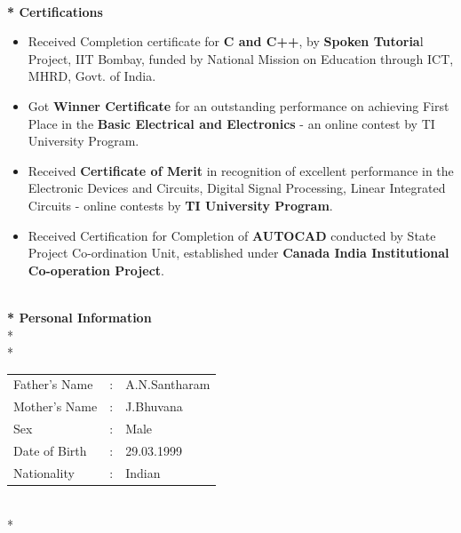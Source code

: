 \documentclass{article}
\begin{document}
\begin{flushleft}
\begin{enumerate}
\begin{itemize}
\end{itemize}
\end{enumerate}

\textbf{\\*  Certifications}
\begin{itemize}
\item Received Completion certificate for \textbf{C and C++}, by \textbf{Spoken Tutoria}l Project, IIT Bombay, funded by National Mission on Education through ICT, MHRD, Govt. of India.
\item Got \textbf{Winner Certificate} for an outstanding performance on achieving First Place in the \textbf{Basic Electrical and Electronics} - an online contest by TI University Program.
\item Received \textbf{Certificate of Merit} in recognition of excellent performance in the {Electronic Devices and Circuits, Digital Signal Processing, Linear Integrated Circuits} - online contests by \textbf{TI University Program}.
\item Received Certification for Completion of \textbf{AUTOCAD} conducted by State Project Co-ordination Unit, established under \textbf{Canada India Institutional Co-operation Project}.
\end{itemize}
\end{flushleft}

\textbf{\\* Personal Information} 
\\* 
\\*
\hspace*{8pt}
\begin{tabular}{ l l l }
Father's Name & : & A.N.Santharam \\ 
Mother's Name & : & J.Bhuvana\\ 
Sex & : & Male \\ 
Date of Birth & : & 29.03.1999 \\ 
Nationality & : & Indian \\
\end{tabular}
\\* 
\end{document}
